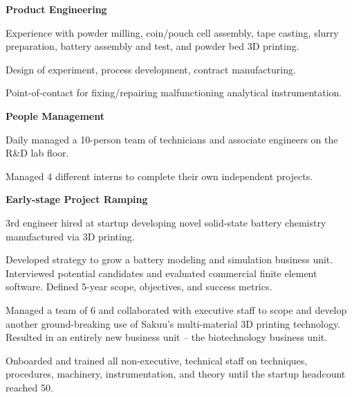 \documentclass[letterpaper,10.8pt]{article}
\begin{document}
{\vspace{-2pt}\item\small{\textbf{Product Engineering}\vspace{-2pt}}}
\begin{description}[font=$\bullet$]
\item{Experience with powder milling, coin/pouch cell assembly, tape casting, slurry preparation, battery assembly and test, and powder bed 3D printing.}
\item{Design of experiment, process development, contract manufacturing.}
\item{Point-of-contact for fixing/repairing malfunctioning analytical instrumentation.}
\end{description} 

{\vspace{-2pt}\item\small{\textbf{People Management}\vspace{-2pt}}} 
\begin{description}[font=$\bullet$]
\item{Daily managed a 10-person team of technicians and associate engineers on the R\&D lab floor.}
\item{Managed 4 different interns to complete their own independent projects.}
\end{description}

{\vspace{-2pt}\item\small{\textbf{Early-stage Project Ramping}\vspace{-2pt}}}
\begin{description}[font=$\bullet$]
\item{3rd engineer hired at startup developing novel solid-state battery chemistry manufactured via 3D printing.}
\item{Developed strategy to grow a battery modeling and simulation business unit. Interviewed potential candidates and evaluated commercial finite element software. Defined 5-year scope, objectives, and success metrics.}
\item{Managed a team of 6 and collaborated with executive staff to scope and develop another ground-breaking use of Sakuu's multi-material 3D printing technology. Resulted in an entirely new business unit -- the biotechnology business unit.}
\item{Onboarded and trained all non-executive, technical staff on techniques, procedures, machinery, instrumentation, and theory until the startup headcount reached 50.} 
\end{description}
\end{document}
